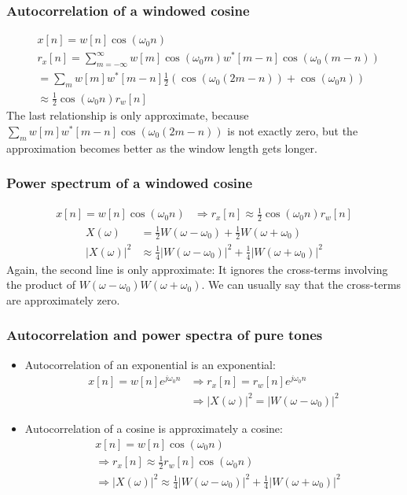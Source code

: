 \documentclass{beamer}
\begin{document}
\begin{frame}
  \frametitle{Autocorrelation of a windowed cosine}

  \begin{align*}
    &x[n] =w[n]\cos(\omega_0 n)\\
    &r_x[n] = \sum_{m=-\infty}^\infty w[m]\cos(\omega_0 m)w^*[m-n]\cos(\omega_0(m-n))\\
    &=\sum_m w[m]w^*[m-n]\frac{1}{2}\left(\cos(\omega_0(2m-n))+\cos(\omega_0 n)\right)\\
    &\approx \frac{1}{2}\cos(\omega_0 n)r_w[n]
  \end{align*}
  The last relationship is only approximate, because
  $\sum_mw[m]w^*[m-n]\cos(\omega_0(2m-n))$ is not exactly zero, but
  the approximation becomes better as the window length gets longer.
\end{frame}

\begin{frame}
  \frametitle{Power spectrum of a windowed cosine}

  \begin{align*}
    x[n] =w[n]\cos(\omega_0 n) &\Rightarrow 
    r_x[n] \approx \frac{1}{2}\cos(\omega_0 n)r_w[n]
  \end{align*}
  \begin{align*}
    X(\omega) &= \frac{1}{2}W(\omega-\omega_0)+\frac{1}{2}W(\omega+\omega_0)\\
    |X(\omega)|^2 &\approx \frac{1}{4}|W(\omega-\omega_0)|^2+\frac{1}{4}|W(\omega+\omega_0)|^2
  \end{align*}
  Again, the second line is only approximate: It ignores the cross-terms
  involving the product of $W(\omega-\omega_0)W(\omega+\omega_0)$.  We can
  usually say that the cross-terms are approximately zero.
\end{frame}

\begin{frame}
  \frametitle{Autocorrelation and power spectra of pure tones}

  \begin{itemize}
  \item Autocorrelation of an exponential is an exponential:
    \begin{align*}
      x[n]=w[n]e^{j\omega_0 n} &\Rightarrow r_x[n]=r_w[n]e^{j\omega_0 n}\\
      &\Rightarrow |X(\omega)|^2=|W(\omega-\omega_0)|^2
    \end{align*}
  \item Autocorrelation of a cosine is approximately a cosine:
    \begin{align*}
      &x[n]=w[n]\cos(\omega_0 n) \\
      &\Rightarrow r_x[n]\approx \frac{1}{2}r_w[n]\cos(\omega_0 n)\\
      &\Rightarrow |X(\omega)|^2\approx
      \frac{1}{4}|W(\omega-\omega_0)|^2+\frac{1}{4}|W(\omega+\omega_0)|^2
    \end{align*}
  \end{itemize}
\end{frame}
\end{document}
